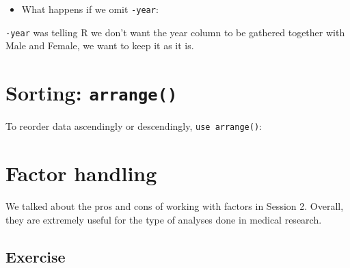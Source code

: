 \documentclass[12pt,]{krantz}
\makeatletter
\newenvironment{Shaded}{\begin{snugshade}}{\end{snugshade}}
\newcommand{\CommentTok}[1]{\textcolor[rgb]{0.56,0.35,0.01}{\textit{#1}}}
\newcommand{\DataTypeTok}[1]{\textcolor[rgb]{0.13,0.29,0.53}{#1}}
\newcommand{\KeywordTok}[1]{\textcolor[rgb]{0.13,0.29,0.53}{\textbf{#1}}}
\newcommand{\NormalTok}[1]{#1}
\newcommand{\OperatorTok}[1]{\textcolor[rgb]{0.81,0.36,0.00}{\textbf{#1}}}
\newcommand{\StringTok}[1]{\textcolor[rgb]{0.31,0.60,0.02}{#1}}
\providecommand{\tightlist}{%
  \setlength{\itemsep}{0pt}\setlength{\parskip}{0pt}}
\newenvironment{kframe}{%
\medskip{}
\setlength{\fboxsep}{.8em}
 \def\at@end@of@kframe{}%
 \ifinner\ifhmode%
  \def\at@end@of@kframe{\end{minipage}}%
  \begin{minipage}{\columnwidth}%
 \fi\fi%
 \def\FrameCommand##1{\hskip\@totalleftmargin \hskip-\fboxsep
 \colorbox{shadecolor}{##1}\hskip-\fboxsep
     \hskip-\linewidth \hskip-\@totalleftmargin \hskip\columnwidth}%
 \MakeFramed {\advance\hsize-\width
   \@totalleftmargin\z@ \linewidth\hsize
   \@setminipage}}%
 {\par\unskip\endMakeFramed%
 \at@end@of@kframe}
\renewenvironment{Shaded}{\begin{kframe}}{\end{kframe}}
\theoremstyle{definition}
\theoremstyle{definition}
\theoremstyle{definition}
\theoremstyle{remark}
\makeatother
\begin{document}
\begin{itemize}
\tightlist
\item
  What happens if we omit \texttt{-year}:
\end{itemize}

\begin{Shaded}
\end{Shaded}

\texttt{-year} was telling R we don't want the year column to be
gathered together with Male and Female, we want to keep it as it is.

\hypertarget{sorting-arrange}{%
\section{\texorpdfstring{Sorting:
\texttt{arrange()}}{Sorting: arrange()}}\label{sorting-arrange}}

To reorder data ascendingly or descendingly, \texttt{use\ arrange()}:

\begin{Shaded}
\end{Shaded}

\newpage

\hypertarget{factor-handling}{%
\section{Factor handling}\label{factor-handling}}

We talked about the pros and cons of working with factors in Session 2.
Overall, they are extremely useful for the type of analyses done in
medical research.

\hypertarget{exercise-16}{%
\subsection{Exercise}\label{exercise-16}}
\end{document}
